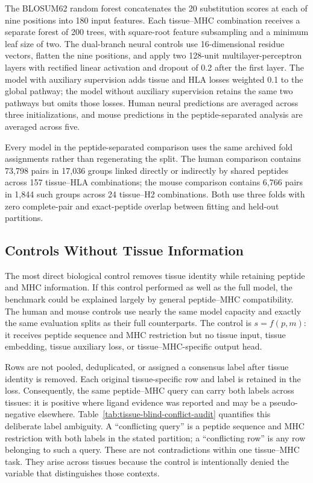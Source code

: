 The BLOSUM62 random forest \cite{henikoff1992blosum} concatenates the 20 substitution scores at each of nine positions into 180 input features. Each tissue--MHC combination receives a separate forest of 200 trees, with square-root feature subsampling and a minimum leaf size of two. The dual-branch neural controls use 16-dimensional residue vectors, flatten the nine positions, and apply two 128-unit multilayer-perceptron layers with rectified linear activation and dropout of 0.2 after the first layer. The model with auxiliary supervision adds tissue and HLA losses weighted 0.1 to the global pathway; the model without auxiliary supervision retains the same two pathways but omits those losses. Human neural predictions are averaged across three initializations, and mouse predictions in the peptide-separated analysis are averaged across five.

Every model in the peptide-separated comparison uses the same archived fold assignments rather than regenerating the split. The human comparison contains 73,798 pairs in 17,036 groups linked directly or indirectly by shared peptides across 157 tissue--HLA combinations; the mouse comparison contains 6,766 pairs in 1,844 such groups across 24 tissue--H2 combinations. Both use three folds with zero complete-pair and exact-peptide overlap between fitting and held-out partitions.

\subsection{Controls Without Tissue Information}

The most direct biological control removes tissue identity while retaining peptide and MHC information. If this control performed as well as the full model, the benchmark could be explained largely by general peptide--MHC compatibility. The human and mouse controls use nearly the same model capacity and exactly the same evaluation splits as their full counterparts. The control is \(s=f(p,m)\): it receives peptide sequence and MHC restriction but no tissue input, tissue embedding, tissue auxiliary loss, or tissue--MHC-specific output head.

Rows are not pooled, deduplicated, or assigned a consensus label after tissue identity is removed. Each original tissue-specific row and label is retained in the loss. Consequently, the same peptide--MHC query can carry both labels across tissues: it is positive where ligand evidence was reported and may be a pseudo-negative elsewhere. Table~\ref{tab:tissue-blind-conflict-audit} quantifies this deliberate label ambiguity. A ``conflicting query'' is a peptide sequence and MHC restriction with both labels in the stated partition; a ``conflicting row'' is any row belonging to such a query. These are not contradictions within one tissue--MHC task. They arise across tissues because the control is intentionally denied the variable that distinguishes those contexts.

